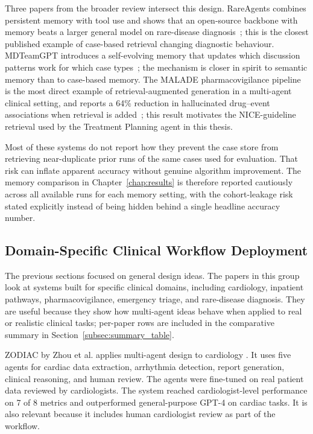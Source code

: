 Three papers from the broader review intersect this design. RareAgents
combines persistent memory with tool use and shows that an open-source
backbone with memory beats a larger general model on rare-disease
diagnosis~\cite{Chen2024RareAgents}; this is the closest published example of
case-based retrieval changing diagnostic behaviour. MDTeamGPT introduces a
self-evolving memory that updates which discussion patterns work for which
case types~\cite{Chen2025MDTeamGPT}; the mechanism is closer in spirit to
semantic memory than to case-based memory. The MALADE pharmacovigilance
pipeline is the most direct example of retrieval-augmented generation in a
multi-agent clinical setting, and reports a 64\% reduction in hallucinated
drug--event associations when retrieval is added~\cite{Choi2024MALADE}; this
result motivates the NICE-guideline retrieval used by the Treatment Planning
agent in this thesis.

Most of these systems do not report how they prevent the case store from
retrieving near-duplicate prior runs of the same cases used for evaluation.
That risk can inflate apparent accuracy without genuine algorithm improvement.
The memory comparison in Chapter~\ref{chap:results} is therefore reported
cautiously across all available runs for each memory setting, with the
cohort-leakage risk stated explicitly instead of being hidden behind a single
headline accuracy number.

\FloatBarrier
\subsection{Domain-Specific Clinical Workflow Deployment}
\label{subsec:domain}

The previous sections focused on general design ideas. The papers in
this group look at systems built for specific clinical domains,
including cardiology, inpatient pathways, pharmacovigilance,
emergency triage, and rare-disease diagnosis. They are useful because
they show how multi-agent ideas behave when applied to real or
realistic clinical tasks; per-paper rows are included in the
comparative summary in Section~\ref{subsec:summary_table}.

ZODIAC by Zhou et al. applies multi-agent design to cardiology
\cite{Zhou2024ZODIAC}. It uses five agents for cardiac data extraction,
arrhythmia detection, report generation, clinical reasoning, and human review.
The agents were fine-tuned on real patient data reviewed by cardiologists. The
system reached cardiologist-level performance on 7 of 8 metrics and outperformed
general-purpose GPT-4 on cardiac tasks. It is also relevant because it includes
human cardiologist review as part of the workflow.

